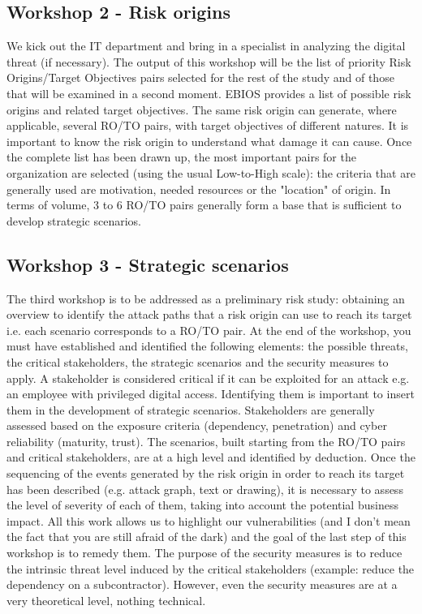 \subsection{Workshop 2 - Risk origins}
We kick out the IT department and bring in a specialist in analyzing the digital threat (if necessary). The output of this workshop will be the list of priority Risk Origins/Target Objectives pairs selected for the rest of the study and of those that will be examined in a second moment. EBIOS provides a list of possible risk origins and related target objectives. The same risk origin can generate, where applicable, several RO/TO pairs, with target objectives of different natures. It is important to know the risk origin to understand what damage it can cause. Once the complete list has been drawn up, the most important pairs for the organization are selected (using the usual Low-to-High scale): the criteria that are generally used are motivation, needed resources or the "location" of origin. In terms of volume, 3 to 6 RO/TO pairs generally form a base that is sufficient to develop strategic scenarios.
\subsection{Workshop 3 - Strategic scenarios}
The third workshop is to be addressed as a preliminary risk study: obtaining an overview to identify the attack paths that a risk origin can use to reach its target i.e. each scenario corresponds to a RO/TO pair. At the end of the workshop, you must have established and identified the following elements: the possible threats, the critical stakeholders, the strategic scenarios and the security measures to apply. A stakeholder is considered critical if it can be exploited for an attack e.g. an employee with privileged digital access. Identifying them is important to insert them in the development of strategic scenarios. Stakeholders are generally assessed based on the exposure criteria (dependency, penetration) and cyber reliability (maturity, trust). The scenarios, built starting from the RO/TO pairs and critical stakeholders, are at a high level and identified by deduction. Once the sequencing of the events generated by the risk origin in order to reach its target has been described (e.g. attack graph, text or drawing), it is necessary to assess the level of severity of each of them, taking into account the potential business impact. All this work allows us to highlight our vulnerabilities (and I don't mean the fact that you are still afraid of the dark) and the goal of the last step of this workshop is to remedy them. The purpose of the security measures is to reduce the intrinsic threat level induced by the critical stakeholders (example: reduce the dependency on a subcontractor). However, even the security measures are at a very theoretical level, nothing technical.
